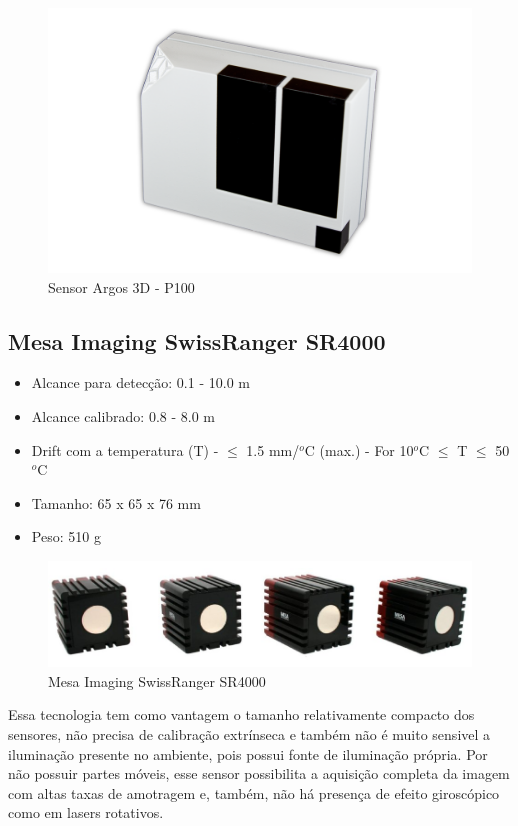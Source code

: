 \begin{figure}[h!]
   \centering
   \includegraphics[width=0.8\columnwidth]{figs/3dsensors/argos3dp100}
   \caption{Sensor Argos 3D - P100}
   \label{fig::forecast}
\end{figure}


\subsection{Mesa Imaging SwissRanger SR4000}


\begin{itemize}
  \item Alcance para detecção: 0.1 - 10.0 m
  \item Alcance calibrado: 0.8 - 8.0 m
  \item Drift com a temperatura (T) - $\leq$ 1.5 mm/$^o$C (max.) - For 10$^o$C
  $\leq$ T $\leq$ 50$^o$C
  \item Tamanho: 65 x 65 x 76 mm
  \item Peso: 510 g
\end{itemize}

\begin{figure}[h!]
   \centering
   \includegraphics[width=0.8\columnwidth]{figs/3dsensors/mesa2}
   \caption{Mesa Imaging SwissRanger SR4000}
   \label{fig::mesa}
\end{figure}


Essa tecnologia tem como vantagem o tamanho relativamente compacto dos sensores,
não precisa de calibração extrínseca e também não é muito sensivel a iluminação
presente no ambiente, pois possui fonte de iluminação própria. Por não possuir
partes móveis, esse sensor possibilita a aquisição completa da imagem com altas
taxas de amotragem e, também, não há presença de efeito giroscópico como em
lasers rotativos.

